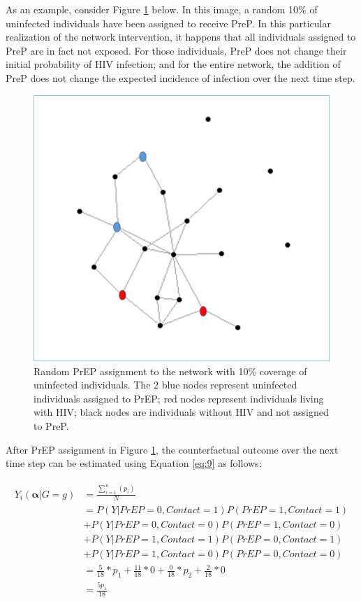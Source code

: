 \documentclass{article}
\theoremstyle{definition}
\begin{document}
As an example, consider Figure \ref{fig: Figure 3}  below. In this image, a random 10\% of uninfected individuals have been assigned to receive PreP. In this particular realization of the network intervention, it happens that all individuals assigned to PreP are in fact not exposed. For those individuals, PreP does not change their initial probability of HIV infection; and for the entire network, the addition of PreP does not change the expected incidence of infection over the next time step.
\begin{figure}[H]
    \centering
    \includegraphics[scale=0.5]{Figures/Network Example 2.png}
    \caption{Random PrEP assignment to the network with 10\% coverage of uninfected individuals. The 2 blue nodes represent uninfected individuals assigned to PrEP; red nodes represent individuals living with HIV; black nodes are individuals without HIV and not assigned to PreP.}
    \label{fig: Figure 3}
\end{figure}

After PrEP assignment in Figure \ref{fig: Figure 3}, the counterfactual outcome over the next time step can be estimated using Equation \ref{eq:9} as follows:

\begin{align}
\begin{split}
Y_{i}\left(\mathbf{\alpha}|G=g\right) & = \frac{\sum_{i=1}^{n}(p_{i})}{N}  \\ 
& = P\left(Y|PrEP = 0, Contact = 1\right)P\left(PrEP = 1, Contact = 1\right)  \\ \nonumber
& +P\left(Y|PrEP = 0, Contact = 0\right)P\left(PrEP = 1, Contact = 0\right)  \\ \nonumber
& +P\left(Y|PrEP = 1, Contact = 1\right)P\left(PrEP = 0, Contact = 1\right) \\ \nonumber
&  +P\left(Y|PrEP = 1, Contact = 0\right)P\left(PrEP = 0, Contact = 0\right) \\ \nonumber
 &=  \frac{5}{18}*p_1 +  \frac{11}{18}*0 +\frac{0}{18}*p_2 +  \frac{2}{18}*0 \\ \nonumber
 &=\frac{5p_1}{18}  \nonumber
\end{split}
\end{align}
\end{document}
